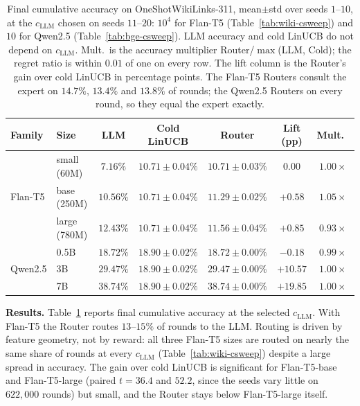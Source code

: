 \documentclass[anon]{alt2027} %
\begin{document}
\begin{table}[ht]
\centering
\caption{Final cumulative accuracy on OneShotWikiLinks-311, mean$\pm$std over
seeds $1$--$10$, at the $c_{\mathrm{LLM}}$ chosen on seeds $11$--$20$: $10^4$ for Flan-T5
(Table~\ref{tab:wiki-csweep}) and $10$ for Qwen2.5 (Table~\ref{tab:bge-csweep}).
LLM accuracy and cold LinUCB do not depend on $c_{\mathrm{LLM}}$. Mult.\ is the accuracy
multiplier Router/$\max$(LLM, Cold); the regret ratio is within $0.01$ of one
on every row. The lift column is the Router's gain over cold LinUCB in
percentage points. The Flan-T5 Routers consult the expert on $14.7\%$,
$13.4\%$ and $13.8\%$ of rounds; the Qwen2.5 Routers on every round, so they
equal the expert exactly.}
\label{tab:wiki-results}
\small
\begin{tabular}{@{}llccccc@{}}
\toprule
Family & Size & LLM & Cold LinUCB & Router & Lift (pp) & Mult.\ \\
\midrule
\multirow{3}{*}{Flan-T5} & small (60M) & $7.16\%$  & $10.71\pm 0.04\%$ & $10.71\pm 0.03\%$ & $0.00$ & $1.00\times$ \\
& base (250M)   & $10.56\%$ & $10.71\pm 0.04\%$ & $11.29\pm 0.02\%$ & $+0.58$ & $1.05\times$ \\
& large (780M)  & $12.43\%$ & $10.71\pm 0.04\%$ & $11.56\pm 0.04\%$ & $+0.85$ & $0.93\times$ \\
\midrule
\multirow{3}{*}{Qwen2.5} & 0.5B  & $18.72\%$ & $18.90\pm 0.02\%$ & $18.72\pm0.00\%$ & $-0.18$ & $0.99\times$ \\
& 3B  & $29.47\%$ & $18.90\pm 0.02\%$ & $29.47\pm0.00\%$ & $+10.57$ & $1.00\times$ \\
& 7B  & $38.74\%$ & $18.90\pm 0.02\%$ & $38.74\pm0.00\%$ & $+19.85$ & $1.00\times$ \\
\bottomrule
\end{tabular}
\end{table}

\textbf{Results.} Table~\ref{tab:wiki-results} reports final cumulative
accuracy at the selected $c_{\mathrm{LLM}}$. With Flan-T5 the Router routes $13$--$15\%$
of rounds to the LLM. Routing is driven by feature geometry, not by
reward: all three Flan-T5 sizes are routed on nearly the same share of
rounds at every $c_{\mathrm{LLM}}$ (Table~\ref{tab:wiki-csweep}) despite a large spread
in accuracy. The gain over cold LinUCB is significant for Flan-T5-base and
Flan-T5-large (paired $t=36.4$ and $52.2$, since the seeds vary little on
$622{,}000$ rounds) but small, and the Router stays below Flan-T5-large itself.
\end{document}
